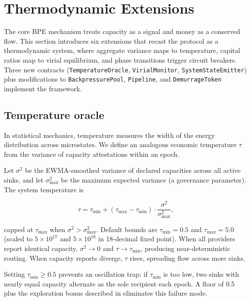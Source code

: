 \section{Thermodynamic Extensions}
\label{sec:thermodynamic}

The core BPE mechanism treats capacity as a signal and money as a
conserved flow. This section introduces six extensions that recast the
protocol as a thermodynamic system, where aggregate variance maps to
temperature, capital ratios map to virial equilibrium, and phase
transitions trigger circuit breakers. Three new contracts
(\texttt{TemperatureOracle}, \texttt{VirialMonitor},
\texttt{SystemStateEmitter}) plus modifications to
\texttt{BackpressurePool}, \texttt{Pipeline}, and
\texttt{DemurrageToken} implement the framework.

\subsection{Temperature oracle}
\label{sec:temperature}

In statistical mechanics, temperature measures the width of the energy
distribution across microstates. We define an analogous economic
temperature $\tau$ from the variance of capacity attestations
within an epoch.

Let $\sigma^2$ be the EWMA-smoothed variance of declared capacities
across all active sinks, and let $\sigma^2_{\max}$ be the maximum
expected variance (a governance parameter). The system temperature is

\begin{equation}
  \tau = \tau_{\min} + (\tau_{\max} - \tau_{\min})
         \cdot \frac{\sigma^2}{\sigma^2_{\max}},
  \label{eq:temperature}
\end{equation}

\noindent capped at $\tau_{\max}$ when $\sigma^2 > \sigma^2_{\max}$.
Default bounds are $\tau_{\min} = 0.5$ and $\tau_{\max} = 5.0$
(scaled to $5 \times 10^{17}$ and $5 \times 10^{18}$ in 18-decimal
fixed point). When all providers report identical capacity, $\sigma^2
\to 0$ and $\tau \to \tau_{\min}$, producing near-deterministic
routing. When capacity reports diverge, $\tau$ rises, spreading flow
across more sinks.

Setting $\tau_{\min} \geq 0.5$ prevents an oscillation trap: if
$\tau_{\min}$ is too low, two sinks with nearly equal capacity
alternate as the sole recipient each epoch. A floor of 0.5 plus the
exploration bonus described in  eliminates this
failure mode.

